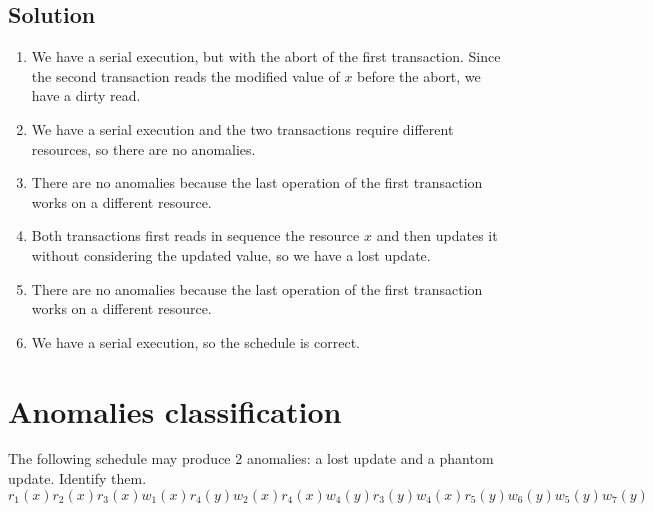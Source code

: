 \documentclass[12pt, a4paper]{report}
\begin{document}
    \subsection*{Solution}
        \begin{enumerate}
            \item We have a serial execution, but with the abort of the first transaction. Since the second transaction reads the modified value of $x$ before the abort, we have a
                dirty read. 
            \item We have a serial execution and the two transactions require different resources, so there are no anomalies.
            \item There are no anomalies because the last operation of the first transaction works on a different resource. 
            \item Both transactions first reads in sequence the resource $x$ and then updates it without considering the updated value, so we have a lost update. 
            \item There are no anomalies because the last operation of the first transaction works on a different resource. 
            \item We have a serial execution, so the schedule is correct. 
        \end{enumerate}

    \newpage

    \section{Anomalies classification}
        The following schedule may produce 2 anomalies: a lost update and a phantom update. Identify them. 
        \[r_1(x) r_2(x) r_3(x) w_1(x) r_4(y) w_2(x) r_4(x) w_4(y) r_3(y)w_4(x) r_5(y) w_6(y) w_5(y) w_7(y)\]
\end{document}
